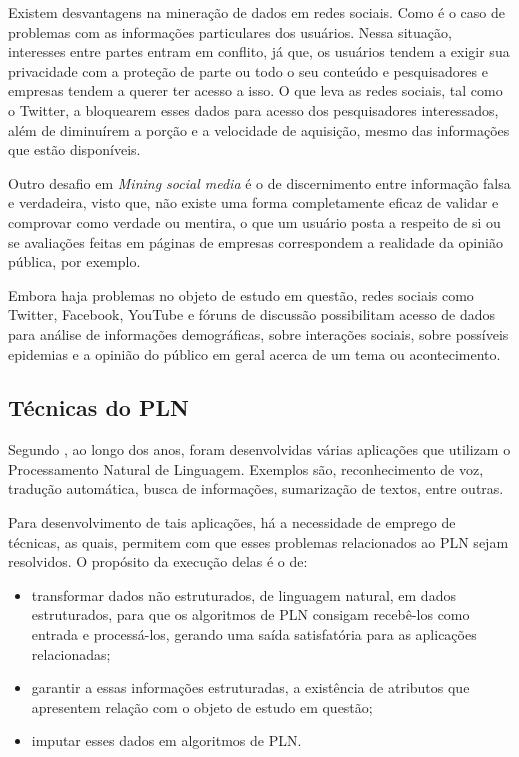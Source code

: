 Existem desvantagens na mineração de dados em redes sociais. Como é o caso de problemas com as informações particulares dos usuários. Nessa situação, interesses entre partes entram em conflito, já que, os usuários tendem a exigir sua privacidade com a proteção de parte ou todo o seu conteúdo e pesquisadores e empresas tendem a querer ter acesso a isso. O que leva as redes sociais, tal como o Twitter, a bloquearem esses dados para acesso dos pesquisadores interessados, além de diminuírem a porção e a velocidade de aquisição, mesmo das informações que estão disponíveis.

Outro desafio em \textit{Mining social media} é o de discernimento entre informação  falsa e verdadeira, visto que, não existe uma forma completamente eficaz de validar e comprovar como verdade ou mentira, o que um usuário posta a respeito de si ou se avaliações feitas em páginas de empresas correspondem a realidade da opinião pública, por exemplo.

Embora haja problemas no objeto de estudo em questão, redes sociais como Twitter, Facebook, YouTube e fóruns de discussão possibilitam acesso de dados para análise de informações demográficas, sobre interações sociais, sobre possíveis epidemias e a opinião do público em geral acerca de um tema ou acontecimento.

\subsection{Técnicas do PLN}

Segundo \cite{tecnicasPLNRanjan:16} , ao longo dos anos, foram desenvolvidas várias aplicações que utilizam o Processamento Natural de Linguagem. Exemplos são, reconhecimento de voz, tradução automática, busca de informações, sumarização de textos, entre outras.

Para desenvolvimento de tais aplicações, há a necessidade de emprego de técnicas, as quais, permitem com que esses problemas relacionados ao PLN sejam resolvidos. O propósito da execução delas é o de: 

\begin{itemize}
\item transformar dados não estruturados, de linguagem natural, em dados estruturados, para que os algoritmos de PLN consigam recebê-los como entrada e processá-los, gerando uma saída satisfatória para as aplicações relacionadas;

\item garantir a essas informações estruturadas, a existência de atributos que apresentem relação com o objeto de estudo em questão;

\item  imputar esses dados em algoritmos de PLN.

\end{itemize}

